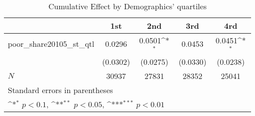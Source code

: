\begin{table}[htbp]\centering
\def\sym#1{\ifmmode^{#1}\else\(^{#1}\)\fi}
\caption{Cumulative Effect by Demographics' quartiles}
\begin{tabular}{l*{4}{c}}
\hline\hline
            &\multicolumn{1}{c}{1st}&\multicolumn{1}{c}{2nd}&\multicolumn{1}{c}{3rd}&\multicolumn{1}{c}{4rd}\\
\hline
poor\_share20105\_st\_qtl&      0.0296         &      0.0501\sym{*}  &      0.0453         &      0.0451\sym{*}  \\
            &    (0.0302)         &    (0.0275)         &    (0.0330)         &    (0.0238)         \\
\hline
\(N\)       &       30937         &       27831         &       28352         &       25041         \\
\hline\hline
\multicolumn{5}{l}{\footnotesize Standard errors in parentheses}\\
\multicolumn{5}{l}{\footnotesize \sym{*} \(p<0.1\), \sym{**} \(p<0.05\), \sym{***} \(p<0.01\)}\\
\end{tabular}
\end{table}
